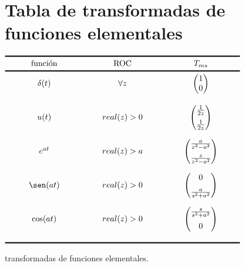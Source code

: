 \documentclass[12pt]{article}
\begin{document}
\section{Tabla de transformadas de funciones elementales}
\begin{table}[h!]
\centering
$\begin{array}{ ccc }
\toprule[0.05cm]
\makebox[3 cm]{\text{función}} & \makebox[3 cm]{\text{ROC}} & \makebox[3 cm]{$T_{ms}$} \\
\midrule[0.05cm]
\delta(t) & \forall z & \begin{pmatrix}1\\0\end{pmatrix}\\[0.7 cm]
u(t) & real(z) > 0 &  \begin{pmatrix}\frac{1}{2z}\\[0.2 cm]\frac{1}{2z}\end{pmatrix}\\[0.7cm]
e^{at} &real(z) > a & \begin{pmatrix}\frac{a}{z^2-a^2}\\[0.2 cm]\frac{z}{z^2-a^2}\end{pmatrix}\\[0.7cm]
\sen(at) & real(z) > 0 &  \begin{pmatrix}0\\[0.2 cm]\frac{a}{s^2+a^2}\end{pmatrix}\\[0.7cm]
\cos(at) & real(z) > 0 &  \begin{pmatrix}\frac{s}{s^2+a^2}\\[0.2 cm]0\end{pmatrix}\\[0.7cm]

\bottomrule[0.05cm]
\end{array}$
\caption{transformadas de funciones elementales.}
\end{table}
\end{document}
